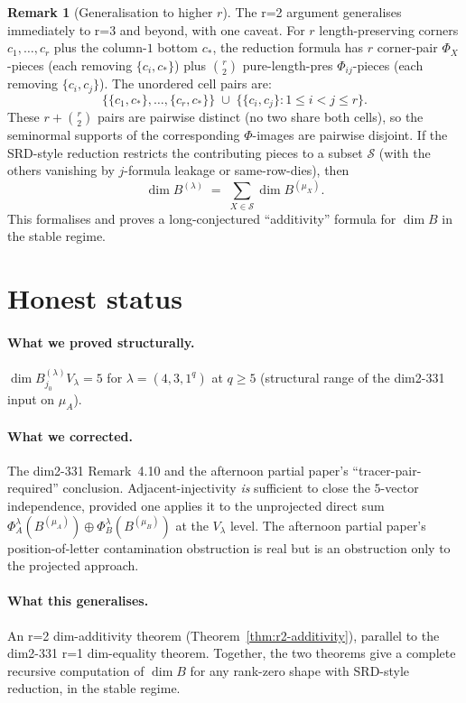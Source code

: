 \documentclass[11pt]{article}
\theoremstyle{definition}
\newtheorem{remark}[theorem]{Remark}
\begin{document}
\begin{remark}[Generalisation to higher $r$]\label{rem:higher-r}
The r=2 argument generalises immediately to r=3 and beyond, with one
caveat. For $r$ length-preserving corners $c_1, \ldots, c_r$ plus the
column-$1$ bottom $c_*$, the reduction formula has $r$ corner-pair
$\Phi_X$-pieces (each removing $\{c_i, c_*\}$) plus
$\binom{r}{2}$ pure-length-pres $\Phi_{ij}$-pieces (each removing
$\{c_i, c_j\}$). The unordered cell pairs are:
\[
   \{\{c_1, c_*\}, \ldots, \{c_r, c_*\}\}
   \;\cup\;
   \{\{c_i, c_j\} : 1 \le i < j \le r\}.
\]
These $r + \binom{r}{2}$ pairs are pairwise distinct (no two share
both cells), so the seminormal supports of the corresponding
$\Phi$-images are pairwise disjoint. If the SRD-style reduction
restricts the contributing pieces to a subset $\mathcal{S}$ (with the
others vanishing by $j$-formula leakage or same-row-dies), then
\[
   \dim B^{(\lambda)} \;=\; \sum_{X \in \mathcal{S}}
   \dim B^{(\mu_X)}.
\]
This formalises and proves a long-conjectured ``additivity'' formula
for $\dim B$ in the stable regime.
\end{remark}

\section{Honest status}\label{sec:honest}

\paragraph{What we proved structurally.}
$\dim B^{(\lambda)}_{j_0} V_\lambda = 5$ for $\lambda = (4, 3, 1^q)$
at $q \ge 5$ (structural range of the dim2-331 input on $\mu_A$).

\paragraph{What we corrected.}
The dim2-331 Remark~4.10 and the afternoon partial paper's
``tracer-pair-required'' conclusion. Adjacent-injectivity \emph{is}
sufficient to close the $5$-vector independence, provided one
applies it to the unprojected direct sum
$\Phi_A^\lambda(B^{(\mu_A)}) \oplus \Phi_B^\lambda(B^{(\mu_B)})$ at
the $V_\lambda$ level. The afternoon partial paper's position-of-letter
contamination obstruction is real but is an obstruction only to the
projected approach.

\paragraph{What this generalises.}
An r=2 dim-additivity theorem (Theorem~\ref{thm:r2-additivity}),
parallel to the dim2-331 r=1 dim-equality theorem. Together, the
two theorems give a complete recursive computation of $\dim B$ for
any rank-zero shape with SRD-style reduction, in the stable regime.
\end{document}
